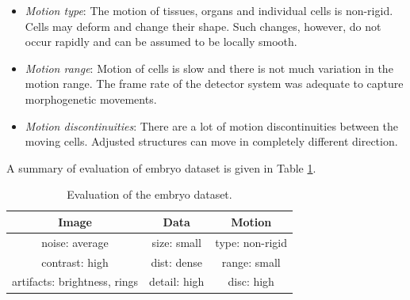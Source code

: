 \begin{itemize}
	\item \textit{Motion type}: The motion of tissues, organs and individual cells is non-rigid. Cells may deform and change their shape. Such changes, however, do not occur rapidly and can be assumed to be locally smooth.
	
	\item \textit{Motion range}: Motion of cells is slow and there is not much variation in the motion range. The frame rate of the detector system was adequate to capture morphogenetic movements.
	
	\item \textit{Motion discontinuities}: There are a lot of motion discontinuities between the moving cells. Adjusted structures can move in completely different direction.
\end{itemize}




A summary of evaluation of embryo dataset is given in Table \ref{tab:eval_embryo}.
\begin{table}[ht] \footnotesize
	\centering
	\caption{Evaluation of the embryo dataset.}
	\begin{tabular}{ccc}
		\toprule
		\textbf{Image} & \textbf{Data}   & \textbf{Motion}   \\ 
		\midrule
		\cellcolor{norm} noise: average         & \cellcolor{bad} size:  small  & \cellcolor{norm}type: non-rigid    \\ 
		\cellcolor{good} contrast: high         & \cellcolor{bad} dist: dense            & \cellcolor{good} range: small  \\ 
		\cellcolor{bad} artifacts: brightness, rings   & \cellcolor{good} detail: high  &  \cellcolor{bad} disc: high   \\ 
		\bottomrule
	\end{tabular}
	\label{tab:eval_embryo}%
\end{table}


